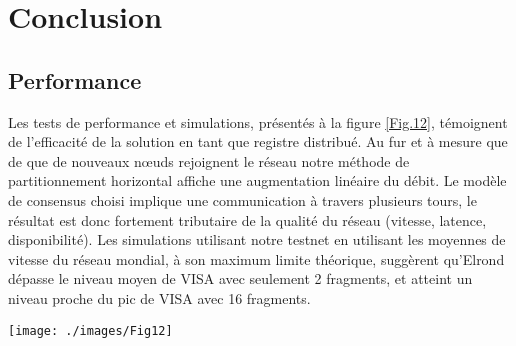 \documentclass[journal]{IEEEtran}
\begin{document}

\section{Conclusion}
\subsection{Performance}

Les tests de performance et simulations, présentés à la figure \ref{Fig.12}, témoignent de l'efficacité de la solution en tant que registre distribué. Au fur et à mesure que de que de nouveaux nœuds rejoignent le réseau notre méthode de partitionnement horizontal affiche une augmentation linéaire du débit.
Le modèle de consensus choisi implique une communication à travers plusieurs tours, le résultat est donc fortement tributaire de la qualité du réseau (vitesse, latence, disponibilité). Les simulations utilisant notre testnet en utilisant les moyennes de vitesse du réseau mondial, à son maximum limite théorique, suggèrent qu'Elrond dépasse le niveau  moyen de VISA avec seulement 2 fragments, et atteint un niveau proche du pic de VISA avec 16 fragments.

\begin{figure*}[h]
         \centering
	\texttt{[image: ./images/Fig12]} %
	\caption{Débit du réseau mesuré en transactions par seconde avec une vitesse globale du réseau de 8 Mo/s} %
	\label{Fig.12} %
\end{figure*}
\end{document}
